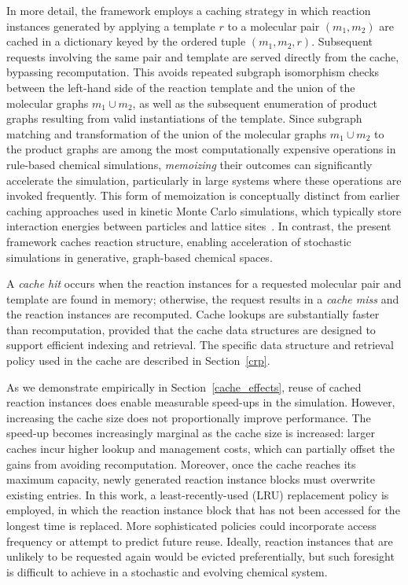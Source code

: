 In more detail, the framework employs a caching strategy in which reaction instances generated by applying a template $r$ to a molecular pair $(m_1, m_2)$ are cached in a dictionary keyed by the ordered tuple $(m_1, m_2, r)$. Subsequent requests involving the same pair and template are served directly from the cache, bypassing recomputation.  This avoids repeated subgraph isomorphism checks between the left-hand side of the reaction template and the union of the molecular graphs $m_1 \cup m_2$, as well as the subsequent enumeration of product graphs resulting from valid instantiations of the template. 
Since subgraph matching and transformation of the union of the molecular graphs $m_1 \cup m_2$ to the product graphs are among the most computationally expensive operations in rule-based chemical simulations, \emph{memoizing} their outcomes can significantly accelerate the simulation, particularly in large systems where these operations are invoked frequently. This form of memoization is conceptually distinct from earlier caching approaches used in kinetic Monte Carlo simulations, which typically store interaction energies between particles and lattice sites~\cite{kmc_cache}. In contrast, the present framework caches reaction structure, enabling acceleration of stochastic simulations in generative, graph-based chemical spaces.

A \emph{cache hit} occurs when the reaction instances for a requested molecular pair and template are found in memory; otherwise, the request results in a \emph{cache miss} and the reaction instances are recomputed. Cache lookups are substantially faster than recomputation, provided that the cache data structures are designed to support efficient indexing and retrieval. The specific data structure and retrieval policy used in the cache are described in Section~\ref{crp}.

As we demonstrate empirically in Section~\ref{cache_effects}, reuse of cached reaction instances does enable measurable speed-ups in the simulation.
However, increasing the cache size does not proportionally improve performance. The speed-up becomes increasingly marginal as the cache size is increased: larger caches incur higher lookup and management costs, which can partially offset the gains from avoiding recomputation.
Moreover, once the cache reaches its maximum capacity, newly generated reaction instance blocks must overwrite existing entries. In this work, a least-recently-used (LRU) replacement policy is employed, in which the reaction instance block that has not been accessed for the longest time is replaced. More sophisticated policies could incorporate access frequency or attempt to predict future reuse. Ideally, reaction instances that are unlikely to be requested again would be evicted preferentially, but such foresight is difficult to achieve in a stochastic and evolving chemical system.


